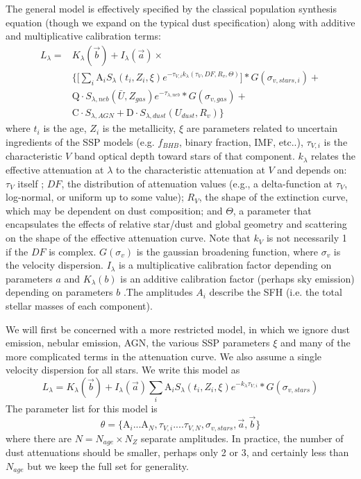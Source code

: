 \documentclass{emulateapj}
\begin{document}
The general model is effectively specified by the classical population synthesis equation (though we expand on the typical dust specification) along with additive and multiplicative calibration terms:
\begin{equation}
\begin{split}
L_\lambda  = & K_\lambda(\vec{b})  + I_\lambda(\vec{a}) \times\\
& \Big\{ \big[\sum\limits_i \text{A}_i S_\lambda (t_i, Z_i ,\xi ) e^{-\tau_{V,i} k_\lambda( \tau_{V}, DF, R_v, \Theta)} \big]\ast G(\sigma_{v, stars, i}) +\\
& \text{Q} \cdot S_{\lambda, neb}(\bar{U}, Z_{gas}) e^{-\tau_{\lambda,neb}} \ast G(\sigma_{v,gas}) + \\ 
& \text{C} \cdot S_{\lambda, AGN} +\text{D} \cdot S_{\lambda, dust}(U_{dust}, R_v) \Big\}
\end{split}
\end{equation}
where $t_i$ is the age, $Z_i$ is the metallicity, $\xi$ are parameters related to uncertain ingredients of the SSP models (e.g. $f_{BHB}$, binary fraction, IMF, etc..), $\tau_{V,i}$ is the characteristic $V$ band optical depth toward stars of that component. $k_\lambda$ relates the effective attenuation at $\lambda$ to the characteristic attenuation at $V$ and depends on: $\tau_V$ itself \citep[e.g.][]{chevallard}; $DF$,  the distribution of attenuation values (e.g., a delta-function at $\tau_V$, log-normal, or uniform up to some value); $R_V$, the shape of the extinction curve, which may be dependent on dust composition; and $\Theta$, a parameter that encapsulates the effects of relative star/dust and global geometry  and scattering on the shape of the effective attenuation curve.  Note that $k_V$ is not necessarily 1 if the $DF$ is complex. $G(\sigma_v)$ is the gaussian broadening function, where $\sigma_v$ is the velocity dispersion. $I_\lambda$ is a multiplicative calibration factor depending on parameters $a$ and $K_\lambda(b)$ is an additive calibration factor (perhaps sky emission) depending on parameters $b$ .The amplitudes $A_i$ describe the SFH (i.e. the total stellar masses of each component).

We will first be concerned with a more restricted model, in which we ignore dust emission, nebular emission, AGN, the various SSP parameters $\xi$ and many of the more complicated terms in the attenuation curve.  We also assume a single velocity dispersion for all stars. %
We write this model as 
\begin{equation}
L_\lambda =  K_\lambda(\vec{b}) + I_\lambda(\vec{a})  \sum\limits_i \text{A}_i S_\lambda (t_i, Z_i, \xi ) e^{-k_\lambda\tau_{V,i} } \ast G(\sigma_{v, stars}) 
\end{equation}
The parameter list for this model is 
\begin{equation}
\theta =  \{\text{A}_i...\text{A}_N, \tau_{V,i}....\tau_{V, N}, \sigma_{v, stars}, \vec{a}, \vec{b}\}
\end{equation}
where there are $N= N_{age} \times N_{Z}$ separate amplitudes.  In practice, the number of dust attenuations should be smaller, perhaps only 2 or 3, and certainly less than $N_{age}$ but we keep the full set for generality.
\end{document}
